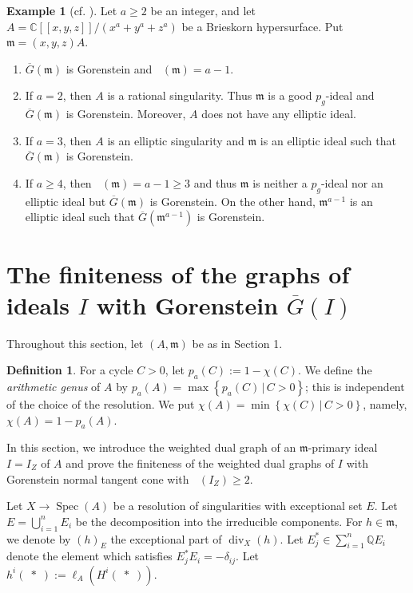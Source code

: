 \documentclass[12pt]{amsart}
\theoremstyle{definition}
\newtheorem{defn}[thm]{Definition}
\newtheorem{exam}[thm]{Example}
\theoremstyle{remark}
\numberwithin{equation}{section}
\DeclareMathOperator{\spec}{Spec}
\DeclareMathOperator{\di}{div}
\DeclareMathOperator{\br}{\bar r}
\newcommand{\m}{\mathfrak m}
\newcommand{\Q}{\mathbb Q}
\renewcommand{\:}{\colon}
\newcommand{\defset}[2]{{\left\{#1\,\left| \,#2 \right. \right\}}}
\begin{document}
\begin{exam} [cf. {\cite{OWY5}}]  
 Let $a \ge 2$ be an integer, and 
let $A=\mathbb{C}[[x,y,z]]/(x^a+y^a+z^a)$ be a Brieskorn hypersurface. 
Put $\m=(x,y,z)A$.  
\begin{enumerate}
\item $\overline{G}(\m)$ is Gorenstein and $\br(\m)=a-1$. 
\item If $a=2$, then $A$ is a rational singularity. 
Thus $\m$ is a good $p_g$-ideal and $\overline{G}(\m)$ is Gorenstein. 
Moreover, $A$ does not have any elliptic ideal. 
\item If $a=3$, then $A$ is an elliptic singularity and 
$\m$ is an elliptic ideal such that $\overline{G}(\m)$ is Gorenstein. 
\item If $a \ge 4$, then $\br(\m)=a-1 \ge 3$ and thus 
$\m$ is neither a $p_g$-ideal nor an elliptic ideal but 
$\overline{G}(\m)$ is Gorenstein.  
On the other hand, $\m^{a-1}$ is an elliptic ideal such that 
$\overline{G}(\m^{a-1})$ is Gorenstein. 
\end{enumerate}
\end{exam}



\bigskip
\section{The  finiteness of the graphs of ideals $I$ with Gorenstein $\overline{G}(I)$}

Throughout this section, let $(A,\m)$ be as in Section 1. 

\begin{defn} \label{ArithGenus}
For a cycle $C>0$, let $p_a(C):=1-\chi(C)$.
We define the {\em arithmetic genus} of $A$ by $p_a(A)=\max\defset{p_a(C)}{C>0}$; this is independent of the choice of the resolution.
We put $\chi(A) = \min\defset{\chi(C)}{C>0}$, namely, $\chi(A)=1-p_a(A)$.
\end{defn}

\par \vspace{1mm}
In this section, we introduce the weighted dual graph of 
an $\m$-primary ideal $I=I_Z$ 
of $A$ and prove the finiteness of 
the weighted dual graphs of $I$ with Gorenstein normal
 tangent cone with $\br(I_Z)\ge 2$.
\par 
Let $X \to \spec (A)$ be a resolution of singularities
 with exceptional set $E$.
Let $E=\bigcup_{i=1}^n E_i$ be the decomposition into the irreducible 
components.
For $h\in \m$, we denote by $(h)_E$ the exceptional part of $\di_X(h)$.
Let $E_j^* \in \sum_{i=1}^n \Q E_i$ denote the element which satisfies $E_j^* E_i = -\delta_{ij}$.
 Let $h^i( \; * \; ):= \ell_A( H^i( \; * \; ))$. 
\end{document}
